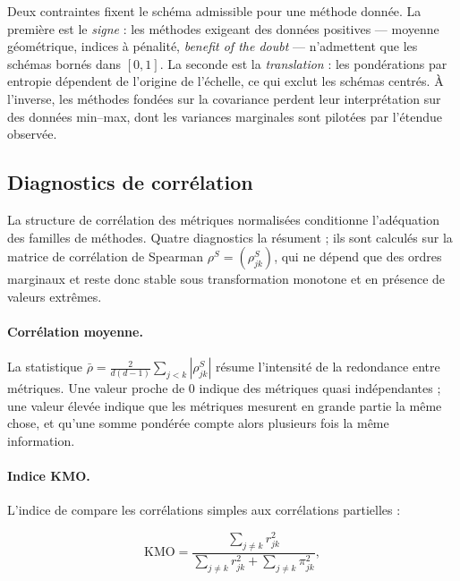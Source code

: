 \documentclass[11pt,a4paper]{article}
\theoremstyle{definition}
\theoremstyle{remark}
\newcommand{\abs}[1]{\left\lvert #1 \right\rvert}
\begin{document}
\bigskip

Deux contraintes fixent le schéma admissible pour une méthode donnée. La première est le
\emph{signe} : les méthodes exigeant des données positives --- moyenne géométrique,
indices à pénalité, \emph{benefit of the doubt} --- n'admettent que les schémas bornés
dans $[0,1]$. La seconde est la \emph{translation} : les pondérations par entropie
dépendent de l'origine de l'échelle, ce qui exclut les schémas centrés. À l'inverse, les
méthodes fondées sur la covariance perdent leur interprétation sur des données min--max,
dont les variances marginales sont pilotées par l'étendue observée.

\bigskip

\subsection{Diagnostics de corrélation}
\label{sec:diagnostics}

\medskip

La structure de corrélation des métriques normalisées conditionne l'adéquation des
familles de méthodes. Quatre diagnostics la résument ; ils sont calculés sur la matrice de
corrélation de Spearman $\rho^S = (\rho^S_{jk})$, qui ne dépend que des ordres marginaux
et reste donc stable sous transformation monotone et en présence de valeurs extrêmes.

\medskip

\paragraph{Corrélation moyenne.} La statistique
$\bar{\rho} = \tfrac{2}{d(d-1)} \sum_{j<k} \abs{\rho^S_{jk}}$ résume l'intensité de la
redondance entre métriques. Une valeur proche de $0$ indique des métriques quasi
indépendantes ; une valeur élevée indique que les métriques mesurent en grande partie la
même chose, et qu'une somme pondérée compte alors plusieurs fois la même information.

\bigskip

\paragraph{Indice KMO.} L'indice de \citet{kaiser1974} compare les corrélations simples
aux corrélations partielles :

\medskip

\[
  \mathrm{KMO} =
  \frac{\sum_{j \ne k} r_{jk}^2}{\sum_{j \ne k} r_{jk}^2 + \sum_{j \ne k} \pi_{jk}^2},
\]
\end{document}
